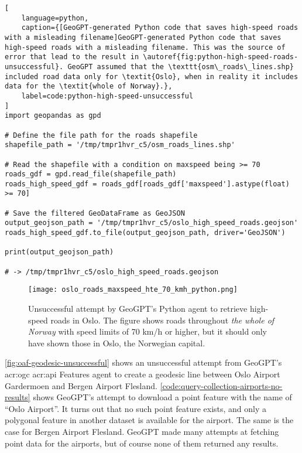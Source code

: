\begin{lstlisting}[
    language=python,
    caption={[GeoGPT-generated Python code that saves high-speed roads with a misleading filename]GeoGPT-generated Python code that saves high-speed roads with a misleading filename. This was the source of error that lead to the result in \autoref{fig:python-high-speed-roads-unsuccessful}. GeoGPT assumed that the \texttt{osm\_roads\_lines.shp} included road data only for \textit{Oslo}, when in reality it includes data for the \textit{whole of Norway}.},
    label=code:python-high-speed-unsuccessful
]
import geopandas as gpd

# Define the file path for the roads shapefile
shapefile_path = '/tmp/tmpr1hvr_c5/osm_roads_lines.shp'

# Read the shapefile with a condition on maxspeed being >= 70
roads_gdf = gpd.read_file(shapefile_path)
roads_high_speed_gdf = roads_gdf[roads_gdf['maxspeed'].astype(float) >= 70]

# Save the filtered GeoDataFrame as GeoJSON
output_geojson_path = '/tmp/tmpr1hvr_c5/oslo_high_speed_roads.geojson'
roads_high_speed_gdf.to_file(output_geojson_path, driver='GeoJSON')

print(output_geojson_path)

# -> /tmp/tmpr1hvr_c5/oslo_high_speed_roads.geojson
\end{lstlisting}

\FloatBarrier

\begin{figure}[htbp]
    \centering
    \texttt{[image: oslo\_roads\_maxspeed\_hte\_70\_kmh\_python.png]}
    \caption[Unsuccessful attempt by GeoGPT's Python agent to retrieve high-speed roads in Oslo]{Unsuccessful attempt by GeoGPT's Python agent to retrieve high-speed roads in Oslo. The figure shows roads throughout \textit{the whole of Norway} with speed limits of 70 km/h or higher, but it should only have shown those in Oslo, the Norwegian capital.}
    \label{fig:python-high-speed-roads-unsuccessful}
\end{figure}


\FloatBarrier

\autoref{fig:oaf-geodesic-unsuccessful} shows an unsuccessful attempt from GeoGPT's \acrshort{acr:ogc} \acrshort{acr:api} Features agent to create a geodesic line between Oslo Airport Gardermoen and Bergen Airport Flesland. \autoref{code:query-collection-airports-no-results} shows GeoGPT's attempt to download a point feature with the name of \enquote{Oslo Airport}. It turns out that no such point feature exists, and only a polygonal feature in another dataset is available for the airport. The same is the case for Bergen Airport Flesland. GeoGPT made many attempts at fetching point data for the airports, but of course none of them  returned any results.

